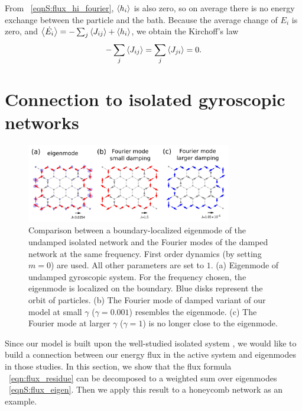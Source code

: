 \documentclass[
 amsmath,amssymb,
 aps,
 pre,
 longbibliography,
 10pt, onecolumn,
 notitlepage
]{revtex4-1}
\begin{document}
From \eqnname~\eqref{eqnS:flux_hi_fourier}, $\expval{h_i}$ is also zero, so on average there is no energy exchange between the particle and the bath. Because the average change of $E_i$ is zero, and $\expval{\dot{E_i}} = -\sum_j\expval{J_{ij}} + \expval{h_i}$, we obtain the Kirchoff's law
\begin{equation}
    -\sum_j\expval{J_{ij}} = \sum_j\expval{J_{ji}} = 0 .
\end{equation}


\section{Connection to isolated gyroscopic networks}

\begin{figure}[ht]
	\centering
	\includegraphics[width=0.8\textwidth]{Fourier_modes.pdf}
    \caption{
        Comparison between a boundary-localized eigenmode of the undamped isolated network and the Fourier modes of the damped network at the same frequency. First order dynamics (by setting $m=0$) are used. All other parameters are set to $1$.
        (a) Eigenmode of undamped gyroscopic system. For the frequency chosen, the eigenmode is localized on the boundary. Blue disks represent the orbit of particles.
        (b) The Fourier mode of damped variant of our model at small $\gamma$ ($\gamma=0.001$) resembles the eigenmode.
        (c) The Fourier mode at larger $\gamma$ ($\gamma=1$) is no longer close to the eigenmode.
    }
    \label{fig:Fourier_modes}
\end{figure}

Since our model is built upon the well-studied isolated system \cite{Nash2015TopologicalMechanics,Susstrunk2016ClassificationTopological,Mitchell2018AmorphousTopological,Lee2018TopologicalDynamics}, we would like to build a connection between our energy flux in the active system and eigenmodes in those studies.
In this section, we show that the flux formula \eqnname~\eqref{eqn:flux_residue} can be decomposed to a weighted sum over eigenmodes \eqnname~\eqref{eqnS:flux_eigen}. Then we apply this result to a honeycomb network as an example.
\end{document}

